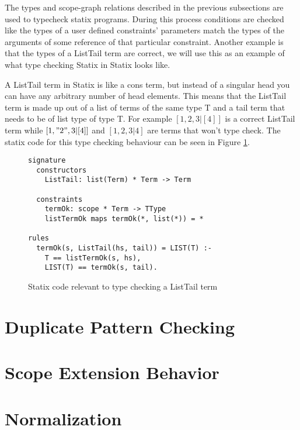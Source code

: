 The types and scope-graph relations described in the previous subsections are used to typecheck statix programs. During this process conditions are checked like the types of a user defined constraints' parameters match the types of the arguments of some reference of that particular constraint. Another example is that the types of a ListTail term are correct, we will use this as an example of what type checking Statix in Statix looks like.

A ListTail term in Statix is like a cons term, but instead of a singular head you can have any arbitrary number of head elements. This means that the ListTail term is made up out of a list of terms of the same type T and a tail term that needs to be of list type of type T. For example \([1, 2, 3|[4]]\) is a correct ListTail term while \([1, "2", 3|[4]]\) and \([1, 2, 3|4]\) are terms that won't type check. The statix code for this type checking behaviour can be seen in Figure \ref{fig:term-example}. 

\begin{figure}[h]
  \begin{lstlisting}
signature
  constructors
    ListTail: list(Term) * Term -> Term

  constraints
    termOk: scope * Term -> TType
    listTermOk maps termOk(*, list(*)) = *

rules
  termOk(s, ListTail(hs, tail)) = LIST(T) :-
    T == listTermOk(s, hs),
    LIST(T) == termOk(s, tail).
  \end{lstlisting}
  \caption{Statix code relevant to type checking a ListTail term}
  \label{fig:term-example}
\end{figure}

\section{Duplicate Pattern Checking}

\section{Scope Extension Behavior}

\section{Normalization}